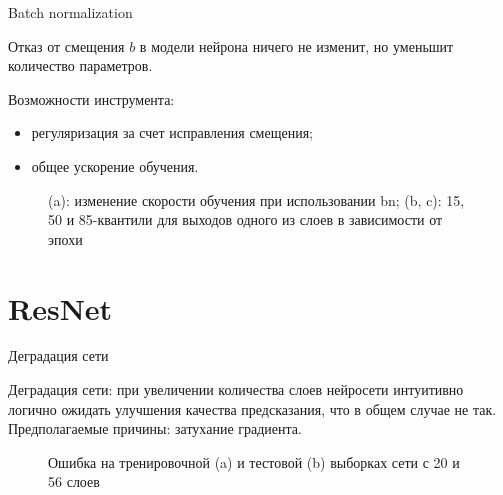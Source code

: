 \documentclass[11pt, intlimits]{beamer}
\begin{document}
\begin{frame}{Batch normalization}

Отказ от смещения $b$ в модели нейрона ничего не изменит, но уменьшит количество параметров.

Возможности инструмента:
\begin{itemize}
\item регуляризация за счет исправления смещения;
\item общее ускорение обучения.
\end{itemize}

\begin{figure}[h]
\caption{(a): изменение скорости обучения при использовании bn; 
(b, c): 15, 50 и 85-квантили для выходов одного из слоев в зависимости от эпохи}
\label{img:bn}
\end{figure}

\end{frame}

\section{ResNet}
\begin{frame}{Деградация сети}

Деградация сети: при увеличении количества слоев нейросети интуитивно логично ожидать улучшения качества предсказания, что в общем случае не так. Предполагаемые причины: затухание градиента.

\begin{figure}[h]
\caption{Ошибка на тренировочной (a) и тестовой (b) выборках сети с 20 и 56 слоев}
\label{img:degrade}
\end{figure}

\end{frame}
\end{document}

